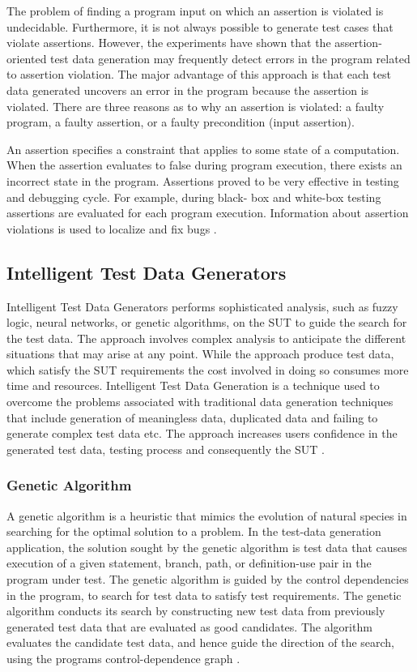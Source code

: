 The problem of finding a program input on which an assertion is violated is undecidable. Furthermore, it is not always possible to generate test cases that violate assertions. However, the experiments have shown that the assertion-oriented test data generation may frequently detect errors in the program related to assertion violation. The major advantage of this approach is that each test data generated uncovers an error in the program because the assertion is violated. There are three reasons as to why an assertion is violated: a faulty program, a faulty assertion, or a faulty precondition (input assertion).

An assertion specifies a constraint that applies to some state of a computation. When the assertion evaluates to false during program execution, there exists an incorrect state in the program. Assertions proved to be very effective in testing and debugging cycle. For example, during black- box and white-box testing assertions are evaluated for each program execution. Information about assertion violations is used to localize and fix bugs \cite{korel1996assertion}.




\subsection{Intelligent Test Data Generators}
Intelligent Test Data Generators performs sophisticated analysis, such as fuzzy logic, neural networks, or genetic algorithms, on the SUT to guide the search for the test data. The approach involves complex analysis to anticipate the different situations that may arise at any point. While the approach produce test data, which satisfy the SUT requirements the cost involved in doing so consumes more time and resources. Intelligent Test Data Generation is a technique used to overcome the problems associated with traditional data generation techniques that include generation of meaningless data, duplicated data and failing to generate complex test data etc.  The approach increases users confidence in the generated test data, testing process and consequently the SUT \cite{ramamoorthy1975testing}.

\subsubsection{Genetic Algorithm}
A genetic algorithm is a heuristic that mimics the evolution of natural species in searching for the optimal solution to a problem. In the test-data generation application, the solution sought by the genetic algorithm is test data that causes execution of a given statement, branch, path, or definition-use pair in the program under test. The genetic algorithm is guided by the control dependencies in the program, to search for test data to satisfy test requirements. The genetic algorithm conducts its search by constructing new test data from previously generated test data that are evaluated as good candidates. The algorithm evaluates the candidate test data, and hence guide the direction of the search, using the programs control-dependence graph \cite{pargas1999test}.

